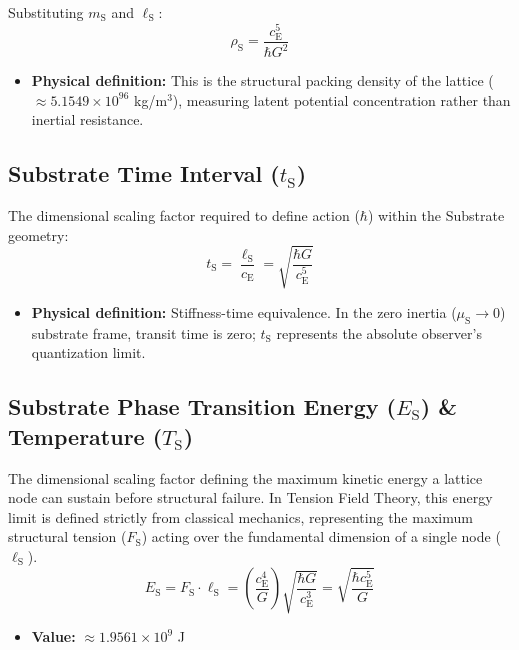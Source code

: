 Substituting $m_{\mathrm{S}}$ and $\ell_{\mathrm{S}}$:
\begin{equation}
    \rho_{\mathrm{S}} = \frac{c_{\mathrm{E}}^5}{\hbar G^2}
\end{equation}

\begin{itemize}
    \item \textbf{Physical definition:} This is the structural packing density of the lattice ($\approx 5.1549 \times 10^{96}$ kg/m$^3$), measuring latent potential concentration rather than inertial resistance.
\end{itemize}

\subsection{Substrate Time Interval (\texorpdfstring{$t_{\mathrm{S}}$}{t\_S})}
The dimensional scaling factor required to define action ($\hbar$) within the Substrate geometry:
\begin{equation}
    t_{\mathrm{S}} = \frac{\ell_{\mathrm{S}}}{c_{\mathrm{E}}} = \sqrt{\frac{\hbar G}{c_{\mathrm{E}}^5}}
\end{equation}

\begin{itemize}
    \item \textbf{Physical definition:} Stiffness-time equivalence. In the zero inertia ($\mu_{\mathrm{S}} \to 0$) substrate frame, transit time is zero; $t_{\mathrm{S}}$ represents the absolute observer's quantization limit.
\end{itemize}

\subsection{Substrate Phase Transition Energy (\texorpdfstring{$E_{\mathrm{S}}$}{E\_S}) \& Temperature (\texorpdfstring{$T_{\mathrm{S}}$}{T\_S})}
The dimensional scaling factor defining the maximum kinetic energy a lattice node can sustain before structural failure. In Tension Field Theory, this energy limit is defined strictly from classical mechanics, representing the maximum structural tension ($F_{\mathrm{S}}$) acting over the fundamental dimension of a single node ($\ell_{\mathrm{S}}$).
\begin{equation}
    E_{\mathrm{S}} = F_{\mathrm{S}} \cdot \ell_{\mathrm{S}} = \left(\frac{c_{\mathrm{E}}^4}{G}\right) \sqrt{\frac{\hbar G}{c_{\mathrm{E}}^3}} = \sqrt{\frac{\hbar c_{\mathrm{E}}^5}{G}}
\end{equation}
\begin{itemize}
    \item \textbf{Value:} $\approx 1.9561 \times 10^9$ J
\end{itemize}

